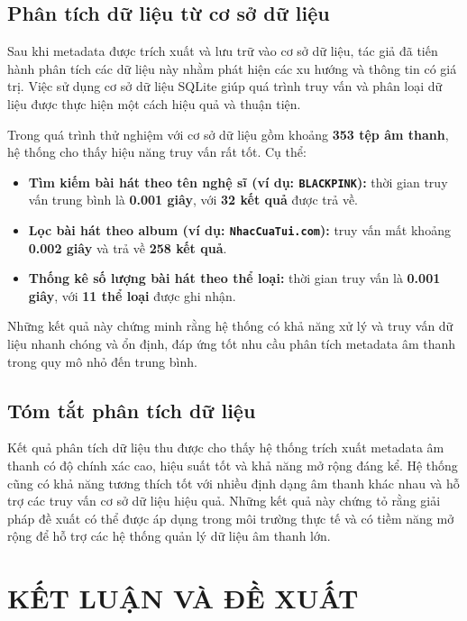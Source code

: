 \documentclass[conference]{IEEEtran}
\begin{document}
\subsection{Phân tích dữ liệu từ cơ sở dữ liệu}

Sau khi metadata được trích xuất và lưu trữ vào cơ sở dữ liệu, tác giả đã tiến hành phân tích các dữ liệu này nhằm phát hiện các xu hướng và thông tin có giá trị. Việc sử dụng cơ sở dữ liệu SQLite giúp quá trình truy vấn và phân loại dữ liệu được thực hiện một cách hiệu quả và thuận tiện. 

Trong quá trình thử nghiệm với cơ sở dữ liệu gồm khoảng \textbf{353 tệp âm thanh}, hệ thống cho thấy hiệu năng truy vấn rất tốt. Cụ thể:

\begin{itemize}
    \item \textbf{Tìm kiếm bài hát theo tên nghệ sĩ (ví dụ: \texttt{BLACKPINK}):} thời gian truy vấn trung bình là \textbf{0.001 giây}, với \textbf{32 kết quả} được trả về.
    \item \textbf{Lọc bài hát theo album (ví dụ: \texttt{NhacCuaTui.com}):} truy vấn mất khoảng \textbf{0.002 giây} và trả về \textbf{258 kết quả}.
    \item \textbf{Thống kê số lượng bài hát theo thể loại:} thời gian truy vấn là \textbf{0.001 giây}, với \textbf{11 thể loại} được ghi nhận.
\end{itemize}

Những kết quả này chứng minh rằng hệ thống có khả năng xử lý và truy vấn dữ liệu nhanh chóng và ổn định, đáp ứng tốt nhu cầu phân tích metadata âm thanh trong quy mô nhỏ đến trung bình.

\subsection{Tóm tắt phân tích dữ liệu}
Kết quả phân tích dữ liệu thu được cho thấy hệ thống trích xuất metadata âm thanh có độ chính xác cao, hiệu suất tốt và khả năng mở rộng đáng kể. Hệ thống cũng có khả năng tương thích tốt với nhiều định dạng âm thanh khác nhau và hỗ trợ các truy vấn cơ sở dữ liệu hiệu quả. Những kết quả này chứng tỏ rằng giải pháp đề xuất có thể được áp dụng trong môi trường thực tế và có tiềm năng mở rộng để hỗ trợ các hệ thống quản lý dữ liệu âm thanh lớn.

\section{KẾT LUẬN VÀ ĐỀ XUẤT}
\end{document}
